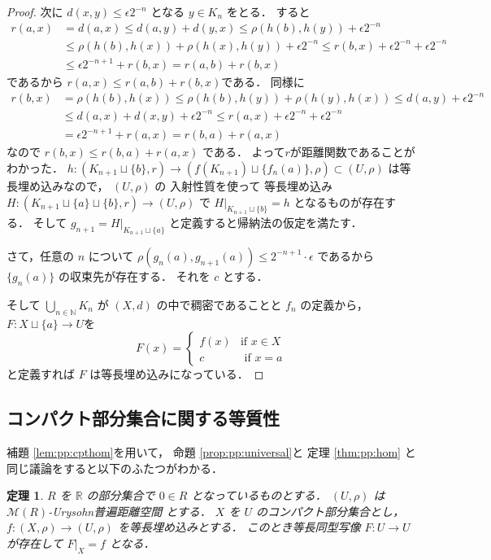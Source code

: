 \documentclass[leqno, 12pt]{jsarticle}
\newtheorem{thm}{定理}[section]
\newcommand{\nn}{\mathbb{N}}
\newcommand{\rr}{\mathbb{R}}
\begin{document}
\begin{proof}
次に
$d(x, y)\le \epsilon 2^{-n}$
となる
$y\in K_{n}$
をとる．
すると
\begin{align*}
r(a, x)&=d(a, x)\le d(a, y)+d(y, x)
\le \rho(h(b), h(y))+ \epsilon2^{-n}\\
&\le \rho(h(b), h(x))+\rho(h(x), h(y)) + \epsilon2^{-n}
\le r(b, x)+\epsilon2^{-n}+\epsilon2^{-n}\\
&\le \epsilon 2^{-n+1}+r(b, x)=r(a, b)+r(b, x)
\end{align*}
であるから
$r(a, x)\le r(a, b)+r(b, x)$である．
同様に
\begin{align*}
r(b, x)&=\rho(h(b), h(x))\le \rho(h(b), h(y))+\rho(h(y), h(x))\le 
d(a, y)+ \epsilon 2^{-n}\\
&\le  d(a, x)+d(x, y)+\epsilon2^{-n}
\le r(a, x) +\epsilon 2^{-n}+\epsilon 2^{-n}\\
&= \epsilon 2^{-n+1}+r(a, x)=r(b, a)+r(a, x)
\end{align*}
なので
$r(b, x)\le r(b, a)+r(a, x)$
である．
よって$r$が距離関数であることがわかった．
$h\colon  (K_{n+1}\sqcup\{b\}, r)\to (f(K_{n+1})\sqcup \{f_{n}(a)\}, \rho)\subset (U, \rho)$
は等長埋め込みなので，
$(U, \rho)$
の
入射性質を使って
等長埋め込み
$H\colon  (K_{n+1}\sqcup\{a\}\sqcup\{b\}, r)\to (U, \rho)$
で
$H|_{K_{n+1}\sqcup\{b\}}=h$
となるものが存在する．
そして
$g_{n+1}=H|_{K_{n+1}\sqcup\{a\}}$
と定義すると帰納法の仮定を満たす．

さて，任意の
$n$
について
$\rho(g_{n}(a), g_{n+1}(a))\le 2^{-n+1}\cdot \epsilon$
であるから
$\{g_{n}(a)\}$
の収束先が存在する．
それを
$c$
とする．



そして
$\bigcup_{n\in \nn}K_{n}$
が
$(X, d)$
の中で稠密であることと
$f_{n}$
の定義から，
$F\colon  X\sqcup \{a\}\to U$を
\[
F(x)=
\begin{cases}
	f(x) & \text{if $x\in X$}\\
	c & \text{ if $x=a$}
\end{cases}
\]
と定義すれば
$F$
は等長埋め込みになっている．
\end{proof}


\subsection{コンパクト部分集合に関する等質性}
補題 
\ref{lem:pp:cpthom}を用いて，
命題 
\ref{prop:pp:universal}と
定理 
\ref{thm:pp:hom}
と同じ議論をすると以下のふたつがわかる．

\begin{thm}\label{thm:pp:cptext}
$R$
を
$\rr$
の部分集合で
$0\in R$
となっているものとする．
$(U, \rho)$
は
$\mathscr{M}(R)$-Urysohn普遍距離空間
とする．
$X$
を
$U$
のコンパクト部分集合とし，
$f\colon  (X, \rho)\to (U, \rho)$
を等長埋め込みとする．
このとき等長同型写像
$F\colon  U\to U$
が存在して
$F|_{X}=f$
となる．
\end{thm}
\end{document}
